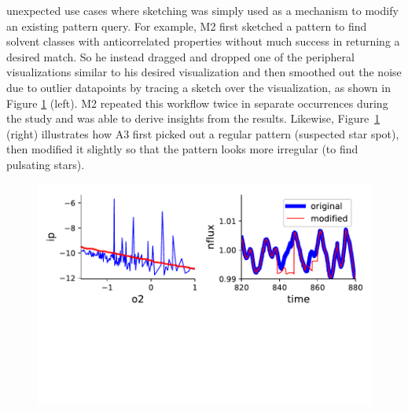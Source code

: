 unexpected use cases where sketching was simply used as a mechanism to modify an existing pattern query. For example, M2 first sketched a pattern to find solvent classes with anticorrelated properties without much success in returning a desired match.
So he instead dragged and dropped one of the peripheral visualizations similar to his desired visualization and then smoothed out the noise due to outlier datapoints by tracing a sketch over the visualization, as shown in Figure \ref{query_modification} (left). M2 repeated this workflow twice in separate occurrences during the study and was able to derive insights from the results. 
Likewise, Figure~\ref{query_modification} (right) illustrates how A3 first picked out a regular pattern (suspected star spot), then modified it slightly so that the pattern looks more irregular (to find pulsating stars). %
\begin{figure}[h!]
    \centering
    \includegraphics[width=\columnwidth]{figures/QueryModificationBySketch.pdf}
    \caption{
    \label{query_modification}}
    \vspace{-10pt}
\end{figure}
